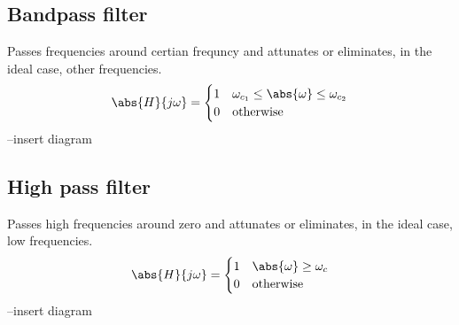 \subsection{Bandpass filter}
Passes frequencies around certian frequncy and attunates or eliminates, in the ideal case, other frequencies.
\begin{equation*}
    \abs{H}{j\omega} = \begin{cases}
        1 & \omega_{c_1} \leq \abs{\omega} \leq \omega_{c_2}\\
        0 & \text{otherwise}
    \end{cases}
\end{equation*}
--insert diagram 
\subsection{High pass filter}
Passes high frequencies around zero and attunates or eliminates, in the ideal case, low frequencies.
\begin{equation*}
    \abs{H}{j\omega} = \begin{cases}
        1 & \abs{\omega} \geq \omega_c\\
        0 & \text{otherwise}
    \end{cases}
\end{equation*}
--insert diagram 

